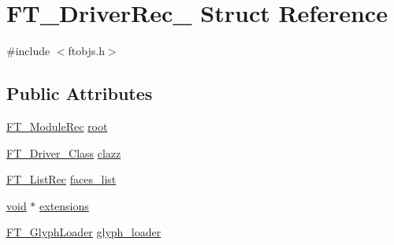 \hypertarget{struct_f_t___driver_rec__}{\section{F\-T\-\_\-\-Driver\-Rec\-\_\- Struct Reference}
\label{struct_f_t___driver_rec__}
}


{\ttfamily \#include $<$ftobjs.\-h$>$}

\subsection*{Public Attributes}
\begin{DoxyCompactItemize}
\item 
\hyperlink{ftobjs_8h_adab1941496d5a44d1a8c2a822c24cfe9}{F\-T\-\_\-\-Module\-Rec} \hyperlink{struct_f_t___driver_rec___a8451ceb25c76794fb47e81f477c8222d}{root}
\item 
\hyperlink{ftdriver_8h_abb8124be69e585349506b14fa2dba4de}{F\-T\-\_\-\-Driver\-\_\-\-Class} \hyperlink{struct_f_t___driver_rec___a3111153608e5abeb093ed5eb7fef5aec}{clazz}
\item 
\hyperlink{fttypes_8h_ac01ed10278dab3cb3f046dba687b50ed}{F\-T\-\_\-\-List\-Rec} \hyperlink{struct_f_t___driver_rec___a2602170e3ecde21a764dc32417aaa002}{faces\-\_\-list}
\item 
\hyperlink{wglew_8h_aeea6e3dfae3acf232096f57d2d57f084}{void} $\ast$ \hyperlink{struct_f_t___driver_rec___ad2f1c1a800723dc887dcbc7ce78203d8}{extensions}
\item 
\hyperlink{ftgloadr_8h_a2671bcb107327e81037ea42332454741}{F\-T\-\_\-\-Glyph\-Loader} \hyperlink{struct_f_t___driver_rec___ac28e7adbc14ee82c2b7710d0ee5541e2}{glyph\-\_\-loader}
\end{DoxyCompactItemize}


